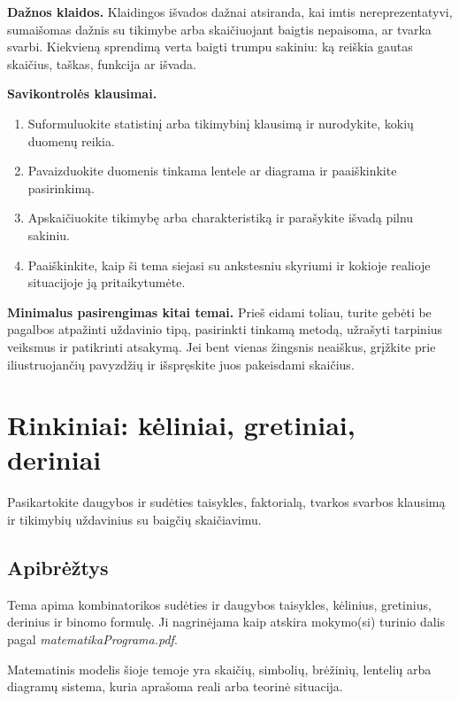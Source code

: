 \textbf{Dažnos klaidos.} Klaidingos išvados dažnai atsiranda, kai imtis nereprezentatyvi, sumaišomas dažnis su tikimybe arba skaičiuojant baigtis nepaisoma, ar tvarka svarbi. Kiekvieną sprendimą verta baigti trumpu sakiniu: ką reiškia gautas skaičius, taškas, funkcija ar išvada.

\textbf{Savikontrolės klausimai.}
\begin{enumerate}[label=\arabic*.]
\item Suformuluokite statistinį arba tikimybinį klausimą ir nurodykite, kokių duomenų reikia.
\item Pavaizduokite duomenis tinkama lentele ar diagrama ir paaiškinkite pasirinkimą.
\item Apskaičiuokite tikimybę arba charakteristiką ir parašykite išvadą pilnu sakiniu.
\item Paaiškinkite, kaip ši tema siejasi su ankstesniu skyriumi ir kokioje realioje situacijoje ją pritaikytumėte.
\end{enumerate}

\textbf{Minimalus pasirengimas kitai temai.} Prieš eidami toliau, turite gebėti be pagalbos atpažinti uždavinio tipą, pasirinkti tinkamą metodą, užrašyti tarpinius veiksmus ir patikrinti atsakymą. Jei bent vienas žingsnis neaiškus, grįžkite prie iliustruojančių pavyzdžių ir išspręskite juos pakeisdami skaičius.

\section{Rinkiniai: kėliniai, gretiniai, deriniai}\label{sec:rinkiniai-keliniai-gretiniai-deriniai}

\begin{tcolorbox}[title=Prieš pradedant, colback=green!5]
Pasikartokite daugybos ir sudėties taisykles, faktorialą, tvarkos svarbos klausimą ir tikimybių uždavinius su baigčių skaičiavimu.
\end{tcolorbox}
\subsection{Apibrėžtys}
\begin{apibreztis}
Tema apima kombinatorikos sudėties ir daugybos taisykles, kėlinius, gretinius, derinius ir binomo formulę. Ji nagrinėjama kaip atskira mokymo(si) turinio dalis pagal \emph{matematikaPrograma.pdf}.
\end{apibreztis}
\begin{apibreztis}
Matematinis modelis šioje temoje yra skaičių, simbolių, brėžinių, lentelių arba diagramų sistema, kuria aprašoma reali arba teorinė situacija.
\end{apibreztis}

